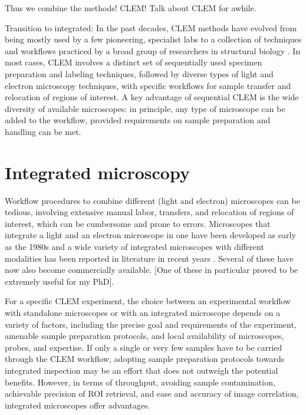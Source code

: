 Thus we combine the methods! CLEM! Talk about CLEM for awhile.

Transition to integrated:
In the past decades, CLEM methods have evolved from being mostly used by a few pioneering, specialist labs to a collection of techniques and workflows practiced by a broad group of researchers in structural biology \cite{de2015correlated}. In most cases, CLEM involves a distinct set of sequentially used specimen preparation and labeling techniques, followed by diverse types of light and electron microscopy techniques, with specific workflows for sample transfer and relocation of regions of interest. A key advantage of sequential CLEM is the wide diversity of available microscopes: in principle, any type of microscope can be added to the workflow, provided requirements on sample preparation and handling can be met. 


\section{Integrated microscopy}

Workflow procedures to combine different (light and electron) microscopes can be tedious, involving extensive manual labor, transfers, and relocation of regions of interest, which can be cumbersome and prone to errors. Microscopes that integrate a light and an electron microscope in one have been developed as early as the 1980s and a wide variety of integrated microscopes with different modalities has been reported in literature in recent years \cite{zonnevylle2013integration, timmermans2015contributed}. Several of these have now also become commercially available. [One of these in particular proved to be extremely useful for my PhD].

For a specific CLEM experiment, the choice between an experimental workflow with standalone microscopes or with an integrated microscope depends on a variety of factors, including the precise goal and requirements of the experiment, amenable sample preparation protocols, and local availability of microscopes, probes, and expertise. If only a single or very few samples have to be carried through the CLEM workflow, adopting sample preparation protocols towards integrated inspection may be an effort that does not outweigh the potential benefits. However, in terms of throughput, avoiding sample contamination, achievable precision of ROI retrieval, and ease and accuracy of image correlation, integrated microscopes offer advantages. 



